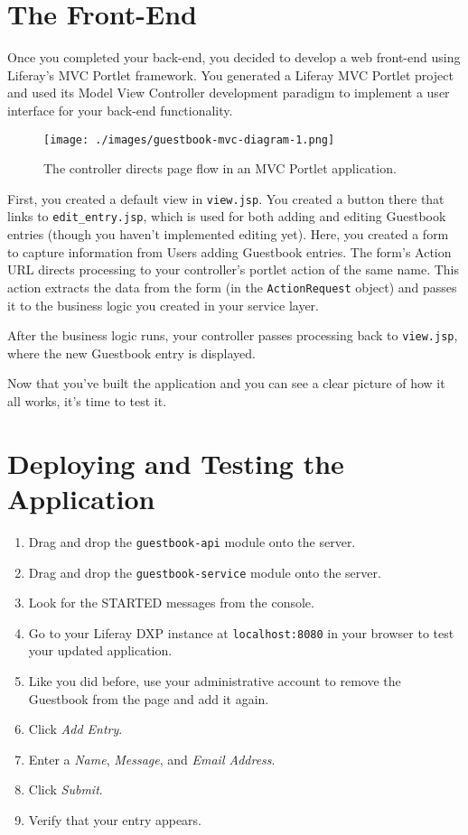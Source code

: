 \section{The Front-End}\label{the-front-end}

Once you completed your back-end, you decided to develop a web front-end
using Liferay's MVC Portlet framework. You generated a Liferay MVC
Portlet project and used its Model View Controller development paradigm
to implement a user interface for your back-end functionality.

\begin{figure}
\centering
\texttt{[image: ./images/guestbook-mvc-diagram-1.png]}
\caption{The controller directs page flow in an MVC Portlet
application.}
\end{figure}

First, you created a default view in \texttt{view.jsp}. You created a
button there that links to \texttt{edit\_entry.jsp}, which is used for
both adding and editing Guestbook entries (though you haven't
implemented editing yet). Here, you created a form to capture
information from Users adding Guestbook entries. The form's Action URL
directs processing to your controller's portlet action of the same name.
This action extracts the data from the form (in the
\texttt{ActionRequest} object) and passes it to the business logic you
created in your service layer.

After the business logic runs, your controller passes processing back to
\texttt{view.jsp}, where the new Guestbook entry is displayed.

Now that you've built the application and you can see a clear picture of
how it all works, it's time to test it.

\section{Deploying and Testing the
Application}\label{deploying-and-testing-the-application}

\begin{enumerate}
\def\labelenumi{\arabic{enumi}.}
\item
  Drag and drop the \texttt{guestbook-api} module onto the server.
\item
  Drag and drop the \texttt{guestbook-service} module onto the server.
\item
  Look for the STARTED messages from the console.
\item
  Go to your Liferay DXP instance at \texttt{localhost:8080} in your
  browser to test your updated application.
\item
  Like you did before, use your administrative account to remove the
  Guestbook from the page and add it again.
\item
  Click \emph{Add Entry}.
\item
  Enter a \emph{Name}, \emph{Message}, and \emph{Email Address}.
\item
  Click \emph{Submit}.
\item
  Verify that your entry appears.
\end{enumerate}

